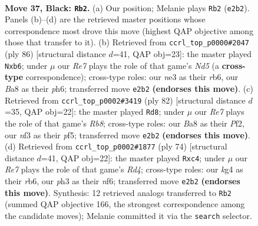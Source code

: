 \documentclass[11pt]{article}
\begin{document}
\clearpage

\begin{figure}[p]\centering
\begin{subfigure}{0.46\textwidth}\centering
\resizebox{\linewidth}{!}{%
\newchessgame
\chessboard[
  setfen={b4k2/P4p2/6p1/4P2n/6K1/R3NN1P/4r3/8 b - - 10 37},
  showmover=false,
  pgfstyle=straightmove, color=movearrow, markmove={e2-b2}
]}
\caption{}
\end{subfigure}\hfill
\begin{subfigure}{0.46\textwidth}\centering
\resizebox{\linewidth}{!}{%
\newchessgame
\chessboard[
  setfen={8/5ppk/1r3n1p/3N4/8/5PP1/5P2/6K1 w - - 0 44},
  showmover=false,
  pgfstyle=straightmove, color=movearrow, markmove={d5-b6}
]}
\caption{}
\end{subfigure}
\\[4pt]
\begin{subfigure}{0.46\textwidth}\centering
\resizebox{\linewidth}{!}{%
\newchessgame
\chessboard[
  setfen={1R6/2n3rp/3Nk3/4pp2/8/7P/5PPK/8 w - - 1 42},
  showmover=false,
  pgfstyle=straightmove, color=movearrow, markmove={b8-d8}
]}
\caption{}
\end{subfigure}\hfill
\begin{subfigure}{0.46\textwidth}\centering
\resizebox{\linewidth}{!}{%
\newchessgame
\chessboard[
  setfen={6k1/6p1/1r3n1p/8/2nR1P1P/1N6/6B1/6K1 w - - 4 38},
  showmover=false,
  pgfstyle=straightmove, color=movearrow, markmove={d4-c4}
]}
\caption{}
\end{subfigure}
\caption{\textbf{Move 37, Black: \texttt{Rb2}.} (a) Our position; Melanie plays \texttt{Rb2} (\texttt{e2b2}). Panels (b)--(d) are the retrieved master positions whose correspondence most drove this move (highest QAP objective among those that transfer to it). (b) Retrieved from \texttt{ccrl\_top\_p0000\#2047} (ply 86) [structural distance $d$=41, QAP obj=23]: the master played \texttt{Nxb6}; under $\mu$ our \emph{Re7} plays the role of that game's \emph{Nd5} (a \textbf{cross-type} correspondence); cross-type roles: our \emph{n}e3 as their \emph{r}b6, our \emph{B}a8 as their \emph{p}h6; transferred move \texttt{e2b2} \textbf{(endorses this move)}. (c) Retrieved from \texttt{ccrl\_top\_p0002\#3419} (ply 82) [structural distance $d$=35, QAP obj=22]: the master played \texttt{Rd8}; under $\mu$ our \emph{Re7} plays the role of that game's \emph{Rb8}; cross-type roles: our \emph{B}a8 as their \emph{P}f2, our \emph{n}f3 as their \emph{p}f5; transferred move \texttt{e2b2} \textbf{(endorses this move)}. (d) Retrieved from \texttt{ccrl\_top\_p0002\#1877} (ply 74) [structural distance $d$=41, QAP obj=22]: the master played \texttt{Rxc4}; under $\mu$ our \emph{Re7} plays the role of that game's \emph{Rd4}; cross-type roles: our \emph{k}g4 as their \emph{r}b6, our \emph{p}h3 as their \emph{n}f6; transferred move \texttt{e2b2} \textbf{(endorses this move)}. Synthesis: 12 retrieved analogs transferred to \texttt{Rb2} (summed QAP objective 166, the strongest correspondence among the candidate moves); Melanie committed it via the \texttt{search} selector.}
\label{fig:thought-m73}
\end{figure}
\end{document}
